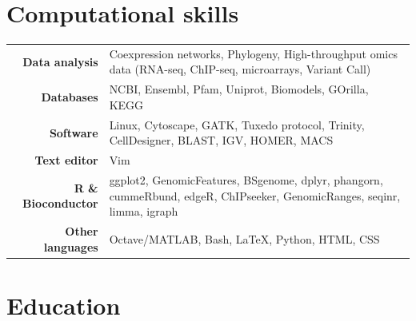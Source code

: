 \documentclass[letterpaper]{article}
\begin{document}
\section*{Computational skills}

\vspace{-2\baselineskip}
\renewcommand{\arraystretch}{1.5}
\begin{table}[!h]

\begin{centering}
\begin{longtable}{>{\bfseries}r p{4.5in}}

Data analysis & Coexpression networks, Phylogeny, High-throughput omics data (RNA-seq, ChIP-seq, microarrays, Variant Call) \\

Databases & NCBI, Ensembl, Pfam, Uniprot, Biomodels, GOrilla, KEGG \\

Software & Linux, Cytoscape, GATK, Tuxedo protocol, Trinity, CellDesigner, BLAST, IGV, HOMER, MACS \\

Text editor & Vim \\

R \& Bioconductor & ggplot2, GenomicFeatures, BSgenome, dplyr, phangorn, cummeRbund, edgeR, ChIPseeker, GenomicRanges, seqinr, limma, igraph \\

Other languages & Octave/MATLAB, Bash, LaTeX, Python, HTML, CSS  \\

\end{longtable}
\end{centering}
\end{table}

\renewcommand{\arraystretch}{1}



\section*{Education}
\end{document}
